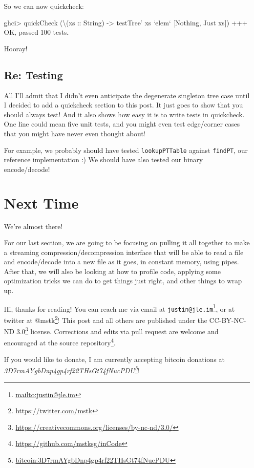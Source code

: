 \documentclass[]{article}
\newenvironment{Shaded}{}{}
\newcommand{\DataTypeTok}[1]{\textcolor[rgb]{0.56,0.13,0.00}{#1}}
\newcommand{\DecValTok}[1]{\textcolor[rgb]{0.25,0.63,0.44}{#1}}
\newcommand{\FunctionTok}[1]{\textcolor[rgb]{0.02,0.16,0.49}{#1}}
\newcommand{\NormalTok}[1]{#1}
\newcommand{\OtherTok}[1]{\textcolor[rgb]{0.00,0.44,0.13}{#1}}
\renewcommand{\href}[2]{#2\footnote{\url{#1}}}
\begin{document}
So we can now quickcheck:

\begin{Shaded}
\begin{Highlighting}[]
\NormalTok{ghci}\FunctionTok{>}\NormalTok{ quickCheck (\textbackslash{}(}\OtherTok{xs ::} \DataTypeTok{String}\NormalTok{) }\OtherTok{->}\NormalTok{ testTree' xs }\OtherTok{`elem`}\NormalTok{ [}\DataTypeTok{Nothing}\NormalTok{, }\DataTypeTok{Just}\NormalTok{ xs])}
\FunctionTok{+++} \DataTypeTok{OK}\NormalTok{, passed }\DecValTok{100}\NormalTok{ tests}\FunctionTok{.}
\end{Highlighting}
\end{Shaded}

Hooray!

\hypertarget{re-testing}{%
\subsection{Re: Testing}\label{re-testing}}

All I'll admit that I didn't even anticipate the degenerate singleton tree case
until I decided to add a quickcheck section to this post. It just goes to show
that you should always test! And it also shows how easy it is to write tests in
quickcheck. One line could mean five unit tests, and you might even test
edge/corner cases that you might have never even thought about!

For example, we probably should have tested \texttt{lookupPTTable} against
\texttt{findPT}, our reference implementation :) We should have also tested our
binary encode/decode!

\hypertarget{next-time}{%
\section{Next Time}\label{next-time}}

We're almost there!

For our last section, we are going to be focusing on pulling it all together to
make a streaming compression/decompression interface that will be able to read a
file and encode/decode into a new file as it goes, in constant memory, using
pipes. After that, we will also be looking at how to profile code, applying some
optimization tricks we can do to get things just right, and other things to wrap
up.

Hi, thanks for reading! You can reach me via email at
\href{mailto:justin@jle.im}{\nolinkurl{justin@jle.im}}, or at twitter at
\href{https://twitter.com/mstk}{@mstk}! This post and all others are published
under the \href{https://creativecommons.org/licenses/by-nc-nd/3.0/}{CC-BY-NC-ND
3.0} license. Corrections and edits via pull request are welcome and encouraged
at \href{https://github.com/mstksg/inCode}{the source repository}.

If you would like to donate, I am currently accepting bitcoin donations at
\emph{\href{bitcoin:3D7rmAYgbDnp4gp4rf22THsGt74fNucPDU}{3D7rmAYgbDnp4gp4rf22THsGt74fNucPDU}}!
\end{document}
